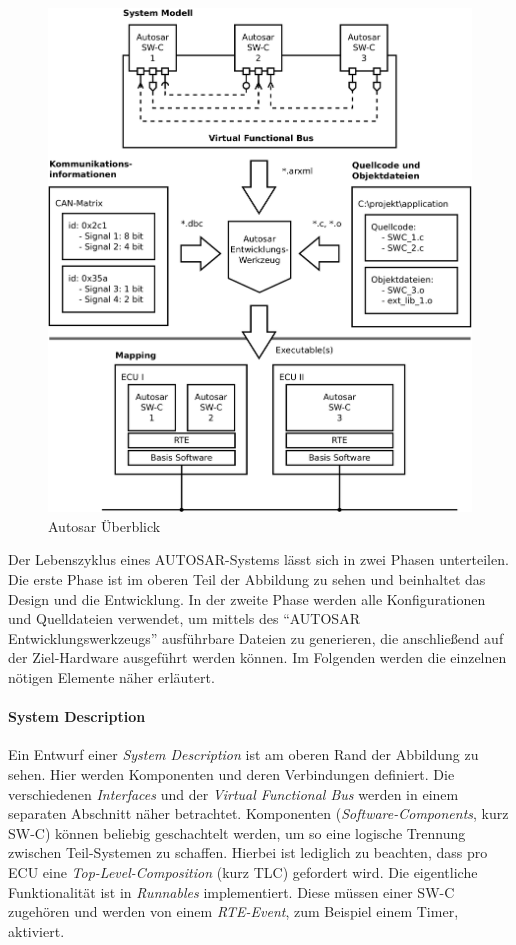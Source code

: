 \documentclass[
  a4paper,					    %
  twoside,
  DIV=calc,     				%
  bibliography=totoc,
  cleardoublepage=empty,
  ngerman,     					%
  final       					%
]{scrbook}
\begin{document}
\begin{figure}[p]
    \centering
    \includegraphics[width=1\textwidth]{autosar_overview}
    \caption{Autosar Überblick}
    \label{fig:autosar_overview}
\end{figure}

Der Lebenszyklus eines AUTOSAR-Systems lässt sich in zwei Phasen unterteilen. Die erste Phase ist im oberen Teil der Abbildung zu sehen und beinhaltet das Design und die Entwicklung. In der zweite Phase werden alle Konfigurationen und Quelldateien verwendet, um mittels des "`AUTOSAR Entwicklungswerkzeugs"'  ausführbare Dateien zu generieren, die anschließend auf der Ziel-Hardware ausgeführt werden können. Im Folgenden werden die einzelnen nötigen Elemente näher erläutert.


\paragraph{System Description} Ein Entwurf einer \emph{System Description} ist am oberen Rand der Abbildung zu sehen. Hier werden Komponenten und deren Verbindungen definiert. Die verschiedenen \emph{Interfaces} und der \emph{Virtual Functional Bus} werden in einem separaten Abschnitt näher betrachtet. Komponenten (\emph{Software-Components}, kurz SW-C) können beliebig geschachtelt werden, um so eine logische Trennung zwischen Teil-Systemen zu schaffen. Hierbei ist lediglich zu beachten, dass pro ECU eine \emph{Top-Level-Composition} (kurz TLC) gefordert wird. Die eigentliche Funktionalität ist in \emph{Runnables} implementiert. Diese müssen einer SW-C zugehören und werden von einem \emph{RTE-Event}, zum Beispiel einem Timer, aktiviert.
\end{document}
